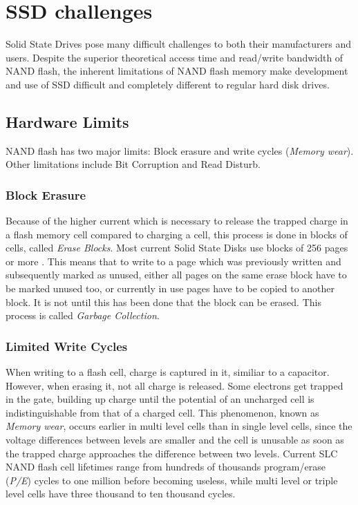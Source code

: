 \documentclass{acm_proc_article-sp}
\begin{document}
\section{SSD challenges}
Solid State Drives pose many difficult challenges to both their manufacturers and users. Despite the superior theoretical access time and read/write bandwidth of NAND flash, the inherent limitations of NAND flash memory make development and use of SSD difficult and completely different to regular hard disk drives.

\subsection{Hardware Limits}
NAND flash has two major limits: Block erasure and write cycles (\emph{Memory wear}). Other limitations include Bit Corruption and Read Disturb.

\subsubsection*{Block Erasure}
Because of the higher current which is necessary to release the trapped charge in a flash memory cell compared to charging a cell, this process is done in blocks of cells, called \emph{Erase Blocks}. Most current Solid State Disks use blocks of 256 pages or more \cite{codecapsule2014coding}.
This means that to write to a page which was previously written and subsequently marked as unused, either all pages on the same erase block have to be marked unused too, or currently in use pages have to be copied to another block. It is not until this has been done that the block can be erased. This process is called \emph{Garbage Collection}.

\subsubsection*{Limited Write Cycles}
When writing to a flash cell, charge is captured in it, similiar to a capacitor. %
However, when erasing it, not all charge is released. Some electrons get trapped in the gate, building up charge until the potential of an uncharged cell is indistinguishable from that of a charged cell. This phenomenon, known as \emph{Memory wear}, occurs earlier in multi level cells than in single level cells, since the voltage differences between levels are smaller and the cell is unusable as soon as the trapped charge approaches the difference between two levels.
Current SLC NAND flash cell lifetimes range from hundreds of thousands program/erase (\emph{P/E}) cycles to one million before becoming useless, while multi level or triple level cells have three thousand to ten thousand cycles.
\end{document}

